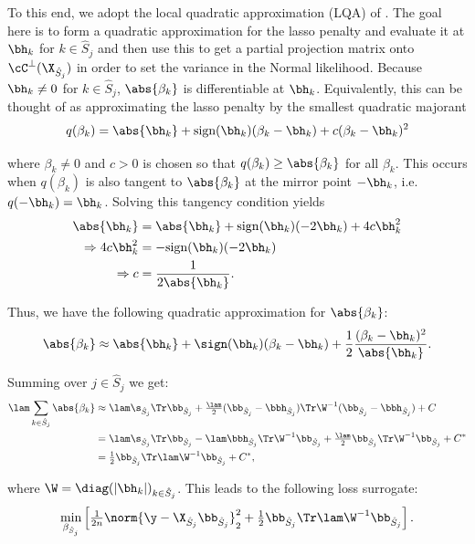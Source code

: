 To this end, we adopt the local quadratic approximation (LQA) of \cite{FanLi2001}. The goal here is to form a quadratic approximation for the lasso penalty and evaluate it at $\bh_k$ for $k \in \hat{S}_j$ and then use this to get a partial projection matrix onto $\cC^\bot(\X_{\hat{S}_j})$ in order to set the variance in the Normal likelihood. Because $\bh_k \neq 0$ for $k \in \hat{S}_j$, $\abs{\beta_k}$ is differentiable at $\bh_k$. Equivalently, this can be thought of as approximating the lasso penalty by the smallest quadratic majorant 
$$q(\beta_k) = \abs{\bh_k} + \text{sign}(\bh_k)(\beta_k - \bh_k) + c(\beta_k - \bh_k)^2$$

\noindent where $\beta_k \neq 0$ and $c > 0$ is chosen so that $q(\beta_k) \geq \abs{\beta_k}$ for all $\beta_k$. This occurs when $q(\beta_k)$ is also tangent to $\abs{\beta_k}$ at the mirror point $-\bh_k$, i.e. $q(-\bh_k) = \bh_k$. Solving this tangency condition yields
$$
\begin{aligned}
\abs{\bh_k} &= \abs{\bh_k} + \text{sign}(\bh_k)(-2\bh_k) + 4c\bh_k^2 \\
\Rightarrow 4c\bh_k^2 &= -\text{sign}(\bh_k)(-2\bh_k) \\
\Rightarrow c &= \frac{1}{2\abs{\bh_k}}.
\end{aligned}
$$

\noindent Thus, we have the following quadratic approximation for $\abs{\beta_k}$:
$$
\abs{\beta_k} \approx \abs{\bh_k} + \sign(\bh_k)(\beta_k - \bh_k) + \frac{1}{2}\frac{(\beta_k - \bh_k)^2}{\abs{\bh_k}}.
$$

\noindent Summing over $j \in \hat{S}_j$ we get:
$$
\begin{aligned}
\lam \sum_{k \in \hat{S}_j}\abs{\beta_k} &\approx \lam \s_{\hat{S}_j} \Tr \bb_{\hat{S}_j} + \tfrac{\lam}{2} (\bb_{\hat{S}_j} - \bbh_{\hat{S}_j}) \Tr \W^{-1} (\bb_{\hat{S}_j} - \bbh_{\hat{S}_j}) + C \\
&= \lam \s_{\hat{S}_j} \Tr \bb_{\hat{S}_j}  - \lam \bbh_{\hat{S}_j} \Tr\W^{-1} \bb_{\hat{S}_j} + \tfrac{\lam}{2} \bb_{\hat{S}_j} \Tr \W^{-1} \bb_{\hat{S}_j} + C^* \\
&= \tfrac{1}{2} \bb_{\hat{S}_j} \Tr \lam\W^{-1} \bb_{\hat{S}_j} + C^*, \\
\end{aligned}
$$

\noindent where $\W = \diag(|\bh_k|)_{k \in \hat{S}_j}$. This leads to the following loss surrogate:
$$
\min_{\beta_{\hat{S}_j}} \left[ \tfrac{1}{2n}\norm{\y - \X_{\hat{S}_j} \bb_{\hat{S}_j}}_2^2 + \tfrac{1}{2} \bb_{\hat{S}_j} \Tr \lam\W^{-1} \bb_{\hat{S}_j} \right].
$$

